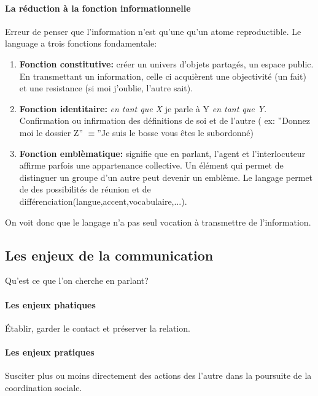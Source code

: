 \documentclass[11pt]{article} %
\begin{document}
		 \paragraph{La réduction à la fonction informationnelle}
		 Erreur de penser que l'information n'est qu'une qu'un atome reproductible. Le language a trois fonctions fondamentale:
		\begin{enumerate}
		\item \textbf{Fonction constitutive:} créer un univers d'objets partagés, un espace public.  En transmettant un information, celle ci acquièrent une objectivité (un fait) et une resistance  (si moi j'oublie, l'autre sait).
		\item \textbf{Fonction identitaire:} \textit{en tant que X} je parle à Y \textit{en tant que Y}. Confirmation ou infirmation des définitions de soi et de l'autre ( ex: ''Donnez moi le dossier Z'' 
		 $\equiv$''Je suis le bosse vous êtes le subordonné)
		\item \textbf{Fonction emblèmatique:} signifie que en parlant, l'agent et l'interlocuteur affirme parfois
		 une appartenance collective. Un élément qui permet de distinguer un groupe d'un autre peut devenir
		 un emblème. Le langage permet de des possibilités de réunion et de 
		 différenciation(langue,accent,vocabulaire,...).
		\end{enumerate}
On voit donc que le langage n'a pas seul vocation à transmettre de l'information.

	\subsection{Les enjeux de la communication}
		Qu'est ce que l'on cherche en parlant?
		\paragraph{Les  enjeux phatiques} Établir, garder le contact et préserver la relation.
		\paragraph{Les enjeux pratiques} Susciter plus ou moins directement des actions des l'autre dans
		la poursuite de la coordination sociale.
\end{document}
